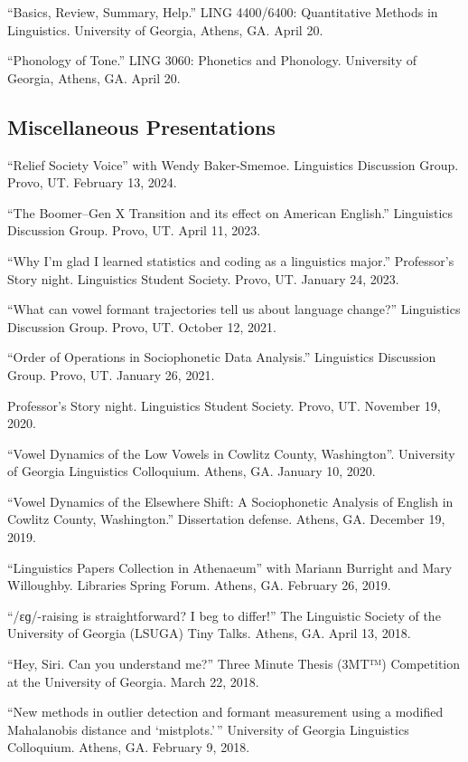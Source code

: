 \documentclass[
]{article}
\begin{document}
``Basics, Review, Summary, Help.'' LING 4400/6400: Quantitative Methods
in Linguistics. University of Georgia, Athens, GA. April 20.

``Phonology of Tone.'' LING 3060: Phonetics and Phonology. University of
Georgia, Athens, GA. April 20.

\hypertarget{miscellaneous-presentations}{%
\subsection{Miscellaneous
Presentations}\label{miscellaneous-presentations}}

``Relief Society Voice'' with Wendy Baker-Smemoe. Linguistics Discussion
Group. Provo, UT. February 13, 2024.

``The Boomer--Gen X Transition and its effect on American English.''
Linguistics Discussion Group. Provo, UT. April 11, 2023.

``Why I'm glad I learned statistics and coding as a linguistics major.''
Professor's Story night. Linguistics Student Society. Provo, UT. January
24, 2023.

``What can vowel formant trajectories tell us about language change?''
Linguistics Discussion Group. Provo, UT. October 12, 2021.

``Order of Operations in Sociophonetic Data Analysis.'' Linguistics
Discussion Group. Provo, UT. January 26, 2021.

Professor's Story night. Linguistics Student Society. Provo, UT.
November 19, 2020.

``Vowel Dynamics of the Low Vowels in Cowlitz County, Washington''.
University of Georgia Linguistics Colloquium. Athens, GA. January 10,
2020.

``Vowel Dynamics of the Elsewhere Shift: A Sociophonetic Analysis of
English in Cowlitz County, Washington.'' Dissertation defense. Athens,
GA. December 19, 2019.

``Linguistics Papers Collection in Athenaeum'' with Mariann Burright and
Mary Willoughby. Libraries Spring Forum. Athens, GA. February 26, 2019.

``/ɛɡ/-raising is straightforward? I beg to differ!'' The Linguistic
Society of the University of Georgia (LSUGA) Tiny Talks. Athens, GA.
April 13, 2018.

``Hey, Siri. Can you understand me?'' Three Minute Thesis (3MT™)
Competition at the University of Georgia. March 22, 2018.

``New methods in outlier detection and formant measurement using a
modified Mahalanobis distance and `mistplots.'\,'' University of Georgia
Linguistics Colloquium. Athens, GA. February 9, 2018.
\end{document}

